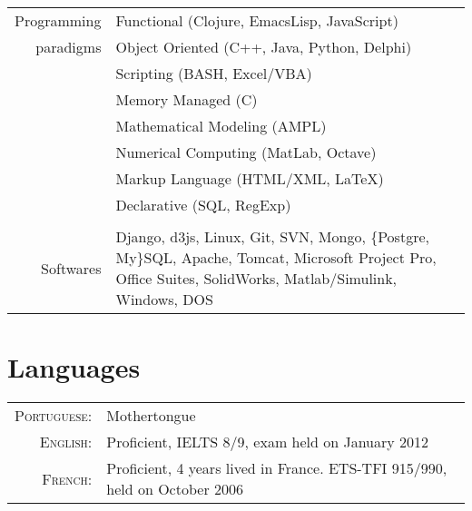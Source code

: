 \documentclass[a4paper,10pt]{article} %
\begin{document}
\begin{tabular}{rp{11cm}}
Programming & Functional (Clojure, EmacsLisp, JavaScript)\\
paradigms & Object Oriented (C++, Java, Python, Delphi)\\
& Scripting (BASH, Excel/VBA)\\
& Memory Managed (C)\\
& Mathematical Modeling (AMPL) \\
& Numerical Computing (MatLab, Octave) \\
& Markup Language (HTML/XML, LaTeX) \\
& Declarative (SQL, RegExp) \\
&\\

Softwares &
Django, d3js, Linux, Git, SVN, Mongo, \{Postgre, My\}SQL,
Apache, Tomcat, Microsoft Project Pro, Office Suites, SolidWorks,
Matlab/Simulink, Windows, DOS \\




\end{tabular}


\section{Languages}

\begin{tabular}{rl}
  \textsc{Portuguese:} &
  Mothertongue\\

  \textsc{English:} &
  Proficient, IELTS 8/9, exam held on January 2012\\

  \textsc{French:} &
  Proficient, 4 years lived in France. ETS-TFI 915/990, held on October 2006\\



\end{tabular}
\end{document}
